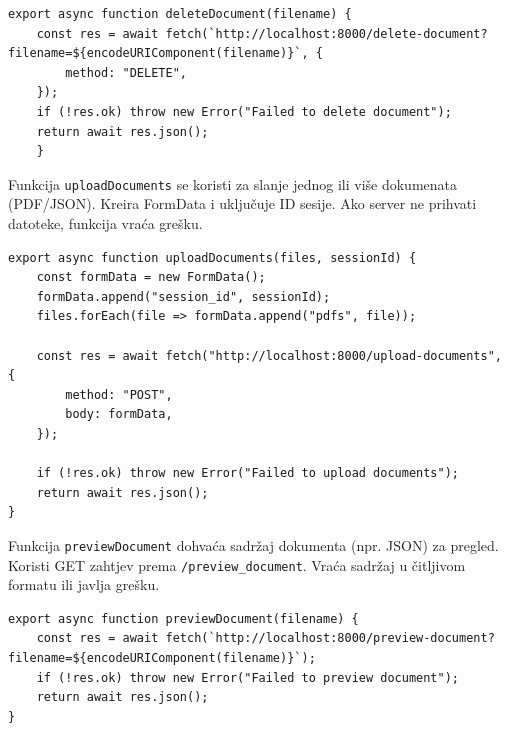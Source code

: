 \documentclass[]{foi}
\begin{document}
\begin{longlisting}
\begin{verbatim}
export async function deleteDocument(filename) {
    const res = await fetch(`http://localhost:8000/delete-document?filename=${encodeURIComponent(filename)}`, {
        method: "DELETE",
    });
    if (!res.ok) throw new Error("Failed to delete document");
    return await res.json();
    }
\end{verbatim}
\caption{Document.jsx 3/5}
\label{lst:document3}
\end{longlisting}

Funkcija \verb|uploadDocuments| se koristi za slanje jednog ili više dokumenata (PDF/JSON). Kreira FormData i uključuje ID sesije. Ako server ne prihvati
datoteke, funkcija vraća grešku.

\begin{longlisting}
\begin{verbatim}
export async function uploadDocuments(files, sessionId) {
    const formData = new FormData();
    formData.append("session_id", sessionId);
    files.forEach(file => formData.append("pdfs", file));

    const res = await fetch("http://localhost:8000/upload-documents", {
        method: "POST",
        body: formData,
    });

    if (!res.ok) throw new Error("Failed to upload documents");
    return await res.json();
}
\end{verbatim}
\caption{Document.jsx 4/5}
\label{lst:document4}
\end{longlisting}

Funkcija \verb|previewDocument| dohvaća sadržaj dokumenta (npr. JSON) za pregled. Koristi GET zahtjev prema \verb|/preview_document|. Vraća sadržaj u čitljivom 
formatu ili javlja grešku.

\begin{longlisting}
\begin{verbatim}
export async function previewDocument(filename) {
    const res = await fetch(`http://localhost:8000/preview-document?filename=${encodeURIComponent(filename)}`);
    if (!res.ok) throw new Error("Failed to preview document");
    return await res.json();
}
\end{verbatim}
\caption{Document.jsx 5/5}
\label{lst:document5}
\end{longlisting}
\end{document}
